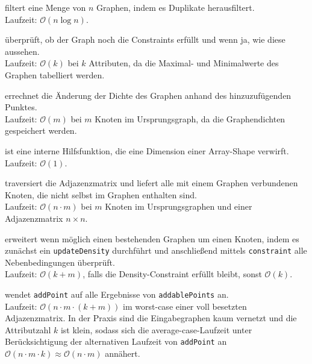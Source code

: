 \documentclass[a4paper]{scrartcl}
\begin{document}
\begin{description}[style=multiline,leftmargin=2.75cm,font=\bfseries]
 \item[filterLayer] filtert eine Menge von $n$ Graphen, indem es Duplikate herausfiltert. \\ Laufzeit: $\mathcal{O}(n \log n)$.
 \item[constraint] überprüft, ob der Graph noch die Constraints erfüllt und wenn ja, wie diese aussehen. \\ Laufzeit: $\mathcal{O}(k)$ bei $k$ Attributen, da die Maximal- und Minimalwerte des Graphen tabelliert werden.
 \item[updateDensity] errechnet die Änderung der Dichte des Graphen anhand des hinzuzufügenden Punktes. \\ Laufzeit: $\mathcal{O}(m)$ bei $m$ Knoten im Ursprungsgraph, da die Graphendichten gespeichert werden.
 \item[reduceDim] ist eine interne Hilfsfunktion, die eine Dimension einer Array-Shape verwirft. \\ Laufzeit: $\mathcal{O}(1)$.
 \item[addablePoints] traversiert die Adjazenzmatrix und liefert alle mit einem Graphen verbundenen Knoten, die nicht selbst im Graphen enthalten sind. \\ Laufzeit: $\mathcal{O}(n \cdot m)$ bei $m$ Knoten im Ursprungsgraphen und einer Adjazenzmatrix $n\times n$.
 \item[addPoint] erweitert wenn möglich einen bestehenden Graphen um einen Knoten, indem es zunächst ein \texttt{updateDensity} durchführt und anschließend mittels \texttt{constraint} alle Nebenbedingungen überprüft. \\ Laufzeit: $\mathcal{O}(k + m)$, falls die Density-Constraint erfüllt bleibt, sonst $\mathcal{O}(k)$.
 \item[expand] wendet \texttt{addPoint} auf alle Ergebnisse von \texttt{addablePoints} an.\\
 Laufzeit: $\mathcal{O}(n \cdot m \cdot (k + m))$ im worst-case einer voll besetzten Adjazenzmatrix. In der Praxis sind die Eingabegraphen kaum vernetzt und die Attributzahl $k$ ist klein, sodass sich die average-case-Laufzeit unter Berücksichtigung der alternativen Laufzeit von \texttt{addPoint} an $\mathcal{O}(n \cdot m \cdot k) \approx \mathcal{O}(n \cdot m)$ annähert.
 
\end{description}
\end{document}
